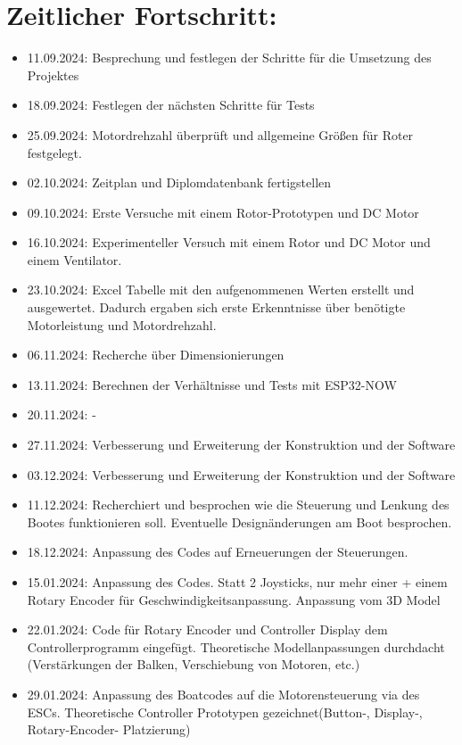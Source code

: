 \documentclass[a4paper,12pt]{article}
\begin{document}
\section{Zeitlicher Fortschritt:}
\begin{itemize}
    \item 11.09.2024: Besprechung und festlegen der Schritte für die Umsetzung des Projektes
    \item 18.09.2024: Festlegen der nächsten Schritte für Tests
    \item 25.09.2024: Motordrehzahl überprüft und allgemeine Größen für Roter festgelegt. 
    \item 02.10.2024: Zeitplan und Diplomdatenbank fertigstellen
    \item 09.10.2024: Erste Versuche mit einem Rotor-Prototypen und DC Motor
    \item 16.10.2024: Experimenteller Versuch mit einem Rotor und DC Motor und einem Ventilator. 
    \item 23.10.2024: Excel Tabelle mit den aufgenommenen Werten erstellt und ausgewertet. Dadurch ergaben sich erste Erkenntnisse über benötigte Motorleistung und Motordrehzahl.
    \item 06.11.2024: Recherche über Dimensionierungen
    \item 13.11.2024: Berechnen der Verhältnisse und Tests mit ESP32-NOW
    \item 20.11.2024: -
    \item 27.11.2024: Verbesserung und Erweiterung der Konstruktion und der Software
    \item 03.12.2024: Verbesserung und Erweiterung der Konstruktion und der Software
    \item 11.12.2024: Recherchiert und besprochen wie die Steuerung und Lenkung des Bootes funktionieren soll. Eventuelle Designänderungen am Boot besprochen.
    \item 18.12.2024: Anpassung des Codes auf Erneuerungen der Steuerungen.
    \item 15.01.2024: Anpassung des Codes. Statt 2 Joysticks, nur mehr einer + einem Rotary Encoder für Geschwindigkeitsanpassung. Anpassung vom 3D Model
    \item 22.01.2024: Code für Rotary Encoder und Controller Display dem Controllerprogramm eingefügt. Theoretische Modellanpassungen durchdacht (Verstärkungen der Balken, Verschiebung von Motoren, etc.)
    \item 29.01.2024: Anpassung des Boatcodes auf die Motorensteuerung via des ESCs. Theoretische Controller Prototypen gezeichnet(Button-, Display-, Rotary-Encoder- Platzierung)

\end{itemize}
\end{document}
